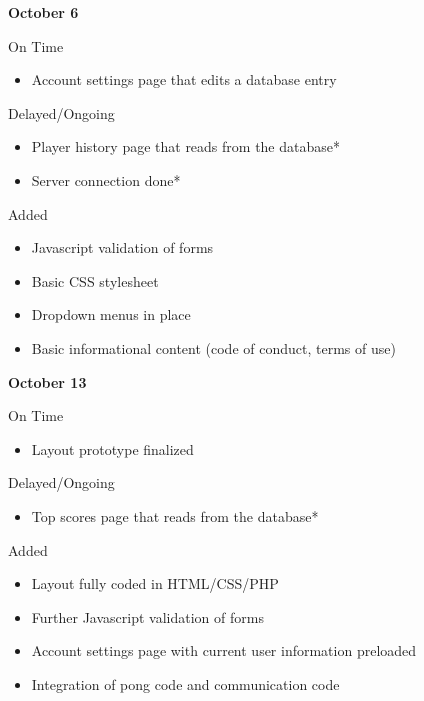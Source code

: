 \begin{description}
				\item \textbf{October 6}
				\begin{description}
					\item On Time
					\begin{itemize}
						\item Account settings page that edits a database entry
					\end{itemize}
					\item Delayed/Ongoing
					\begin{itemize}
						\item Player history page that reads from the database*
						\item Server connection done*
				\end{itemize}
				\item Added
					\begin{itemize}
						\item Javascript validation of forms
						\item Basic CSS stylesheet
						\item Dropdown menus in place
						\item Basic informational content (code of conduct, terms of use)	
					\end{itemize}
				\end{description}
				
				\item \textbf{October 13}
				\begin{description}
					\item On Time
					\begin{itemize}
						\item Layout prototype finalized
					\end{itemize}
					\item Delayed/Ongoing
					\begin{itemize}
						\item Top scores page that reads from the database*
				\end{itemize}
				\item Added
					\begin{itemize}
						\item Layout fully coded in HTML/CSS/PHP
						\item Further Javascript validation of forms
						\item Account settings page with current user information preloaded
						\item Integration of pong code and communication code	
					\end{itemize}
				\end{description}			
				

\end{description}

